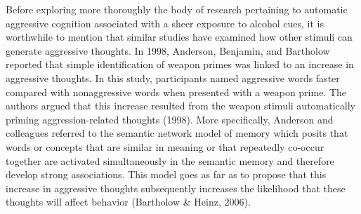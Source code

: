 \documentclass[authordate, serif, review]{jote-article}
\begin{document}
\begin{multicols}{2}
Before exploring more thoroughly the body of research pertaining to automatic aggressive cognition associated with a sheer exposure to alcohol cues, it is worthwhile to mention that similar studies have examined how other stimuli can generate aggressive thoughts. In 1998, Anderson, Benjamin, and Bartholow reported that simple identification of weapon primes was linked to an increase in aggressive thoughts. In this study, participants named aggressive words faster compared with nonaggressive words when presented with a weapon prime. The authors argued that this increase resulted from the weapon stimuli automatically priming aggression-related thoughts (1998). More specifically, Anderson and colleagues referred to the semantic network model of memory which posits that words or concepts that are similar in meaning or that repeatedly co-occur together are activated simultaneously in the semantic memory and therefore develop strong associations. This model goes as far as to propose that this increase in aggressive thoughts subsequently increases the likelihood that these thoughts will affect behavior (Bartholow \& Heinz, 2006).


\end{multicols}
\end{document}
